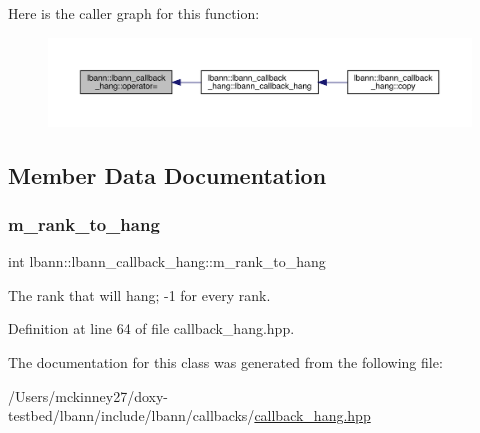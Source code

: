Here is the caller graph for this function\+:\nopagebreak
\begin{figure}[H]
\begin{center}
\leavevmode
\includegraphics[width=350pt]{classlbann_1_1lbann__callback__hang_aef5c147b4f6cf94492564238d049f34d_icgraph}
\end{center}
\end{figure}


\subsection{Member Data Documentation}
\mbox{\label{classlbann_1_1lbann__callback__hang_a6dbd84f40c31b3b1ec3247c8da08a954}} 
\subsubsection{\texorpdfstring{m\+\_\+rank\+\_\+to\+\_\+hang}{m\_rank\_to\_hang}}
{\footnotesize\ttfamily int lbann\+::lbann\+\_\+callback\+\_\+hang\+::m\+\_\+rank\+\_\+to\+\_\+hang\hspace{0.3cm}{\ttfamily [protected]}}



The rank that will hang; -\/1 for every rank. 



Definition at line 64 of file callback\+\_\+hang.\+hpp.



The documentation for this class was generated from the following file\+:\begin{DoxyCompactItemize}
\item 
/\+Users/mckinney27/doxy-\/testbed/lbann/include/lbann/callbacks/\hyperlink{callback__hang_8hpp}{callback\+\_\+hang.\+hpp}\end{DoxyCompactItemize}
